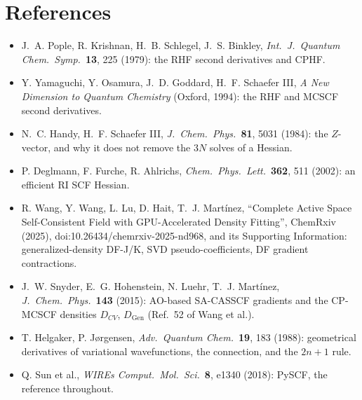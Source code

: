 \documentclass[11pt]{article}
\begin{document}
\section*{References}
\begin{itemize}
  \item J.~A. Pople, R. Krishnan, H.~B. Schlegel, J.~S. Binkley,
        \emph{Int.\ J.\ Quantum Chem.\ Symp.}\ \textbf{13}, 225 (1979):
        the RHF second derivatives and CPHF.
  \item Y. Yamaguchi, Y. Osamura, J.~D. Goddard, H.~F. Schaefer III,
        \emph{A New Dimension to Quantum Chemistry} (Oxford, 1994): the
        RHF and MCSCF second derivatives.
  \item N.~C. Handy, H.~F. Schaefer III, \emph{J.\ Chem.\ Phys.}\
        \textbf{81}, 5031 (1984): the $Z$-vector, and why it does not
        remove the $3N$ solves of a Hessian.
  \item P. Deglmann, F. Furche, R. Ahlrichs,
        \emph{Chem.\ Phys.\ Lett.}\ \textbf{362}, 511 (2002): an efficient
        RI SCF Hessian.
  \item R. Wang, Y. Wang, L. Lu, D. Hait, T.~J. Mart\'inez, ``Complete
        Active Space Self-Consistent Field with GPU-Accelerated Density
        Fitting'', ChemRxiv (2025), doi:10.26434/chemrxiv-2025-nd968, and
        its Supporting Information: generalized-density DF-J/K, SVD
        pseudo-coefficients, DF gradient contractions.
  \item J.~W. Snyder, E.~G. Hohenstein, N. Luehr, T.~J. Mart\'inez,
        \emph{J.\ Chem.\ Phys.}\ \textbf{143} (2015): AO-based SA-CASSCF
        gradients and the CP-MCSCF densities $D_{CV}$, $D_{\mathrm{Gen}}$
        (Ref.~52 of Wang et al.).
  \item T. Helgaker, P. J{\o}rgensen, \emph{Adv.\ Quantum Chem.}\
        \textbf{19}, 183 (1988): geometrical derivatives of variational
        wavefunctions, the connection, and the $2n+1$ rule.
  \item Q. Sun et al., \emph{WIREs Comput.\ Mol.\ Sci.}\ \textbf{8}, e1340
        (2018): PySCF, the reference throughout.
\end{itemize}
\end{document}
